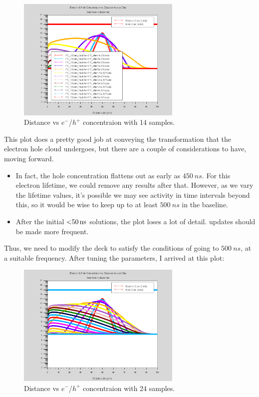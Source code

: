 \documentclass[12pt]{article}
\begin{document}
  \begin{figure}[H]
    \centering
    \includegraphics[width=0.7\textwidth]{n4n10}
    \caption{Distance vs $e^-$/$h^+$ concentraion with 14 samples.}
    \label{fig:n4n10}
  \end{figure}

  This plot does a pretty good job at conveying the transformation that the electron hole cloud undergoes, but there are a couple of considerations to have, moving forward.

  \begin{itemize}
    \item In fact, the hole concentration flattens out as early as $\SI{450}{ns}$. For this electron lifetime, we could remove any results after that. However, as we vary the lifetime values, it's possible we may see activity in time intervals beyond this, so it would be wise to keep up to at least $\SI{500}{ns}$ in the baseline.
    \item After the initial $\SI{<50}{ns}$ solutions, the plot loses a lot of detail. updates should be made more frequent.
  \end{itemize}

  Thus, we need to modify the deck to satisfy the conditions of going to $\SI{500}{ns}$, at a suitable frequency. After tuning the parameters, I arrived at this plot:

  \begin{figure}[H]
    \centering
    \includegraphics[width=0.7\textwidth]{n4n20}
    \caption{Distance vs $e^-$/$h^+$ concentraion with 24 samples.}
    \label{fig:n4n20}
  \end{figure}
\end{document}
